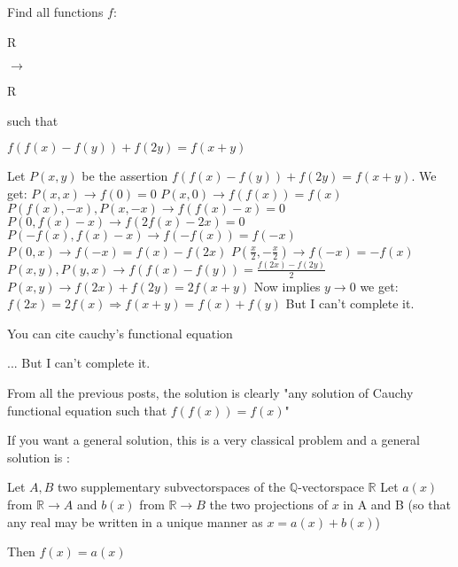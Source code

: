 \begin{solution}
	\begin{tcolorbox}Find all functions $f:$\begin{bolded}R\end{bolded} $ \rightarrow$ \begin{bolded}R\end{bolded}  such that

$f(f(x)-f(y))+f(2y)=f(x+y)$\end{tcolorbox}
Let $P(x,y)$ be the assertion $f(f(x)-f(y))+f(2y)=f(x+y)$. We get:
$P(x,x)\rightarrow f(0)=0$
$P(x,0)\rightarrow f(f(x))=f(x)$
$P(f(x),-x),P(x,-x)\rightarrow f(f(x)-x)=0$
$P(0,f(x)-x)\rightarrow f(2f(x)-2x)=0$
$P(-f(x),f(x)-x)\rightarrow f(-f(x))=f(-x)$
$P(0,x)\rightarrow f(-x)=f(x)-f(2x)$
$P(\frac{x}{2},-\frac{x}{2})\rightarrow f(-x)=-f(x)$
$P(x,y),P(y,x)\rightarrow f(f(x)-f(y))=\frac{f(2x)-f(2y)}{2}$
$P(x,y)\rightarrow f(2x)+f(2y)=2f(x+y)$
Now implies $y \rightarrow 0$ we get:
$f(2x)=2f(x)\Rightarrow f(x+y)=f(x)+f(y)$
But I can't complete it.
\end{solution}



\begin{solution}
	You can cite cauchy's functional equation
\end{solution}



\begin{solution}
	\begin{tcolorbox}...
But I can't complete it.\end{tcolorbox}
From all the previous posts, the solution is clearly "any solution of Cauchy functional equation such that $f(f(x))=f(x)$"

If you want a general solution, this is a very classical problem and a general solution is :

Let $A,B$ two supplementary subvectorspaces of the $\mathbb Q$-vectorspace $\mathbb R$
Let $a(x)$ from $\mathbb R\to A$ and $b(x)$ from $\mathbb R\to B$ the two projections of $x$ in A and B (so that any real may be written in a unique manner as $x=a(x)+b(x)$)

Then $\boxed{f(x)=a(x)}$
\end{solution}



